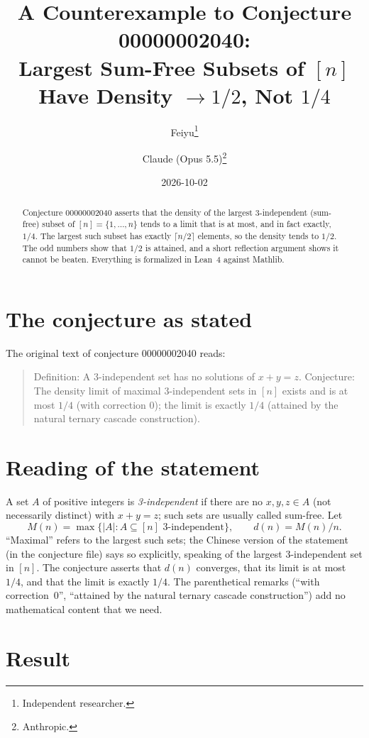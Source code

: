 \documentclass[11pt]{article}
\title{A Counterexample to Conjecture 00000002040:\\
Largest Sum-Free Subsets of $[n]$ Have Density $\to 1/2$, Not $1/4$}
\author{%
  Feiyu\thanks{Independent researcher.}
  \and
  Claude (Opus 5.5)\thanks{Anthropic.}%
}
\date{2026-10-02}
\theoremstyle{plain}
\theoremstyle{definition}
\theoremstyle{remark}
\begin{document}
\maketitle

\begin{abstract}
Conjecture 00000002040 asserts that the density of the largest 3-independent
(sum-free) subset of $[n]=\{1,\ldots,n\}$ tends to a limit that is at most, and
in fact exactly, $1/4$. The largest such subset has exactly
$\lceil n/2\rceil$ elements, so the density tends to $1/2$. The odd numbers
show that $1/2$ is attained, and a short reflection argument shows it cannot be
beaten. Everything is formalized in Lean~4 against Mathlib.
\end{abstract}

\section{The conjecture as stated}

The original text of conjecture 00000002040 reads:

\begin{quote}
Definition: A 3-independent set has no solutions of $x + y = z$. Conjecture:
The density limit of maximal 3-independent sets in $[n]$ exists and is at most
$1/4$ (with correction $0$); the limit is exactly $1/4$ (attained by the
natural ternary cascade construction).
\end{quote}

\section{Reading of the statement}

A set $A$ of positive integers is \emph{3-independent} if there are no
$x,y,z\in A$ (not necessarily distinct) with $x+y=z$; such sets are usually
called sum-free. Let
\[
  M(n)=\max\{|A| : A\subseteq[n]\text{ 3-independent}\},
  \qquad d(n)=M(n)/n .
\]
``Maximal'' refers to the largest such sets; the Chinese version of the
statement (in the conjecture file) says so explicitly, speaking of the largest
3-independent set in $[n]$. The conjecture asserts that $d(n)$
converges, that its limit is at most $1/4$, and that the limit is exactly
$1/4$. The parenthetical remarks (``with correction~$0$'', ``attained by the
natural ternary cascade construction'') add no mathematical content that we
need.

\section{Result}
\end{document}
